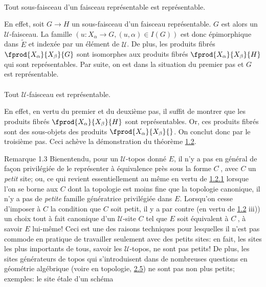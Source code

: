 \documentclass[10pt]{../fichiers-configuration-latex/smfart}
\begin{document}
\paragraph{}
Tout sous-faisceau d'un faisceau représentable est
représentable.

En effet, soit $G\rightarrow H$ un sous-faisceau d'un faisceau
représentable. $G$ est alors un $𝒰$-faisceau. La famille
$(u:X_{\alpha}\rightarrow G, (u,\alpha)\in I(G))$ est donc
épimorphique dans $\widetilde{E}$ et indexée par un élément
de $𝒰$. De plus, les produits fibrés
$\fprod{X_{\alpha}}{X_{\beta}}{G}$ sont isomorphes aux produits
fibrés $\fprod{X_{\alpha}}{X_{\beta}}{H}$ qui sont
représentables. Par suite, on est dans la situation du premier pas
et $G$ est représentable.

\paragraph{}
Tout $𝒰$-faisceau est représentable.

En effet, en vertu du premier et du deuxième pas, il suffit de
montrer que les produits fibrés $\fprod{X_{\alpha}}{X_{\beta}}{H}$
sont représentables. Or, ces produits fibrés sont des
sous-objets des produits $\fprod{X_{\alpha}}{X_{\beta}}{}$. On
conclut donc par le troisième pas. Ceci achève la
démonstration du théorème \hyperref[IV.theo1.2]{1.2}.

\begin{enonce*}[remark]{Remarque 1.3}
Bien\pageoriginale entendu, pour un $𝒰$-topos donné $E$, il
n'y a pas en général de façon privilégiée de le représenter à
équivalence près sous la forme $C^{\widetilde{\phantom{,}}}$, avec
$C$ un \emph{petit} site; ou, ce qui revient essentiellement au même
en vertu de \hyperref[IV.cor1.2.1]{1.2.1} lorsque l'on se borne aux $C$ dont la
topologie est moins fine que la topologie canonique, il n'y a pas de
\emph{petite} famille génératrice privilégiée dans
$E$. Lorsqu'on
cesse d'imposer à $C$ la condition que $C$ soit petit, il y a par
contre (en vertu de \hyperref[IV.theo1.2]{1.2} iii)) un choix tout à fait
canonique d'un $𝒰$-site $C$ tel que $E$ soit équivalent à
$C^{\widetilde{\phantom{,}}}$, à savoir $E$ lui-même! Ceci est une
des raisons techniques pour lesquelles il n'est pas commode en
pratique de travailler seulement avec des petits sites: en fait, les
sites les plus importants de tous, savoir les $𝒰$-topos, ne
sont pas petits! De plus, les sites générateurs de topos qui
s'introduisent dans de nombreuses questions en géométrie algébrique
(voire en topologie, \cf \hyperref[IV.subsec2.5]{2.5}) ne sont pas non plus
petits; exemples: le site étale d'un schéma 
\end{enonce*}
\end{document}
